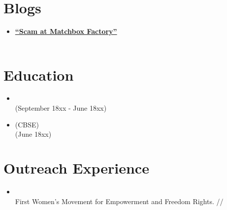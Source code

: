 \documentclass{My_CV}
\begin{document}
\begin{paracol}{2}
\begin{rightcolumn}
\begin{itemize}
\end{itemize}



\section{{\faNewspaperO} Blogs}

\begin{itemize}

    \item \href{https://google.com}{\textbf{“Scam at Matchbox Factory”}} \\
     \\
    
\end{itemize}



\section{{\faGraduationCap} Education}

\begin{itemize}
    
    \item {} \\
     \hfill{(September 18xx - June 18xx)} \\
    
    \item {} {(CBSE)} \\
     \hfill{(June 18xx)}

\end{itemize}



\section{{\faGroup} Outreach Experience}

\begin{itemize}

    \item {} \\
    First Women's Movement for Empowerment and Freedom Rights. //
     \\
    

\end{itemize}
\end{rightcolumn}
\end{paracol}
\end{document}
